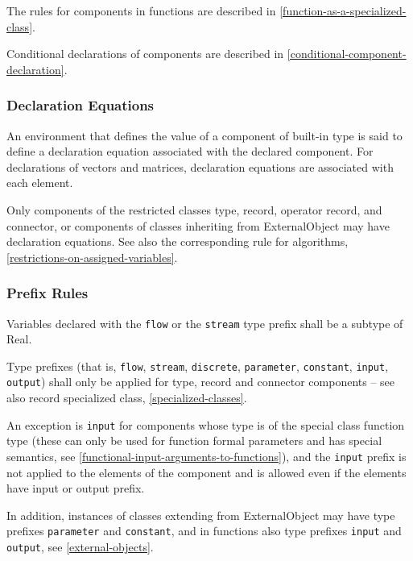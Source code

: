 The rules for components in functions are described in \cref{function-as-a-specialized-class}.

Conditional declarations of components are described in \cref{conditional-component-declaration}.

\subsubsection{Declaration Equations}\label{declaration-equations}

An environment that defines the value of a component of built-in type is
said to define a declaration equation associated with the declared
component. For declarations of vectors and matrices, declaration
equations are associated with each element.

Only components of the restricted classes type, record, operator record, and connector, or components of classes inheriting from ExternalObject
may have declaration equations. See also the corresponding rule for algorithms, \cref{restrictions-on-assigned-variables}.

\subsubsection{Prefix Rules}\label{prefix-rules}

Variables declared with the \lstinline!flow! or the \lstinline!stream! type prefix shall be a
subtype of Real.

Type prefixes (that is, \lstinline!flow!, \lstinline!stream!, \lstinline!discrete!, \lstinline!parameter!, \lstinline!constant!, \lstinline!input!, \lstinline!output!) shall only be applied for type,
record and connector components -- see also record specialized class, \cref{specialized-classes}.

An exception is \lstinline!input! for components whose type is of the special class
function type (these can only be used for function formal parameters and
has special semantics, see \cref{functional-input-arguments-to-functions}), and the \lstinline!input! prefix is not
applied to the elements of the component and is allowed even if the
elements have input or output prefix.

In addition, instances of classes extending from ExternalObject may have type prefixes \lstinline!parameter! and \lstinline!constant!, and in functions also type prefixes \lstinline!input! and
\lstinline!output!, see \cref{external-objects}.

